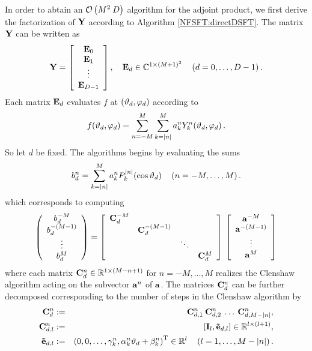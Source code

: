 In order to abtain an $\mathcal{O}\left(M^2 \: D\right)$ algorithm for the adjoint product, we first derive the factorization of $\mathbf{Y}$ according to Algorithm \ref{NFSFT:directDSFT}. The matrix $\mathbf{Y}$ can be written as
$$
  \mathbf{Y} = 
    \left[\begin{array}{c}
      \mathbf{E}_{0}\\
      \mathbf{E}_{1}\\
      \vdots\\
      \mathbf{E}_{D-1}
    \end{array}\right], \quad \mathbf{E}_{d} \in \mathbb{C}^{1 \times (M+1)^2} \quad \left(d=0,\ldots,D-1\right).
$$
Each matrix $\mathbf{E}_{d}$ evaluates $f$ at $\left(\vartheta_{d},\varphi_{d}\right)$ according to 
$$
  f{\hspace{-0.4ex}}\left(\vartheta_{d},\varphi_{d}\right) = \sum_{n=-M}^M \sum_{k=\left\vert n\right\vert}^M a_k^n Y_{k}^n{\hspace{-0.4ex}}\left(\vartheta_{d},\varphi_{d}\right).
$$
So let $d$ be fixed. The algorithms begins by evaluating the sums
$$
  b^{n}_{d} = \sum_{k=\left\vert n\right\vert}^M a_{k}^n P_{k}^{\left\vert n\right\vert}{\hspace{-0.4ex}}\left(\cos\vartheta_{d}\right) \quad \left(n=-M,\ldots,M\right). 
$$
which corresponds to computing
$$
  \left(\begin{array}{c}
    b^{-M}_{d}\\
    b^{-(M-1)}_{d}\\
    \vdots\\
    b^{M}_{d}
  \end{array}\right)
  =
  \left[\begin{array}{cccc}
    \mathbf{C}^{-M}_{d} &                    &        &               \\
                   & \mathbf{C}^{-(M-1)}_{d} &        &               \\
                   &                    & \ddots &               \\
                   &                    &        & \mathbf{C}^{M}_{d} 
  \end{array}\right]
  \:
  \left[\begin{array}{c}
    \mathbf{a}^{-M}\\
    \mathbf{a}^{-(M-1)}\\
    \vdots\\
    \mathbf{a}^{M}
  \end{array}\right]
$$
where each matrix $\mathbf{C}^{n}_{d} \in \mathbb{R}^{1 \times (M-n+1)}$ for $n = -M,\ldots,M$ realizes the Clenshaw algorithm acting on the subvector $\mathbf{a}^n$ of $\mathbf{a}$.
The matrices $\mathbf{C}^{n}_{d}$ can be further decomposed corresponding to the number of steps in the Clenshaw algorithm by
\begin{eqnarray*}
  \mathbf{C}^{n}_{d}       & := & \mathbf{C}_{d,1}^{n} \: \mathbf{C}_{d,2}^{n} \: \ldots \: \mathbf{C}_{d,M-\left\vert n\right\vert}^{n},\\
  \mathbf{C}_{d,l}^{n}     & := & \left[\mathbf{I}_{l}, \mathbf{\tilde{e}}_{d,l}\right] \in \mathbb{R}^{l \times (l+1)},\\
  \mathbf{\tilde{e}}_{d,l} & := & \left(0,0,\ldots,\gamma_{k}^n,\alpha_{k}^n \vartheta_{d} + \beta_{k}^n\right)^{\text{\rm{T}}} \in \mathbb{R}^{l} \quad \left(l=1,\ldots,M-\left\vert n\right\vert\right).
\end{eqnarray*}
